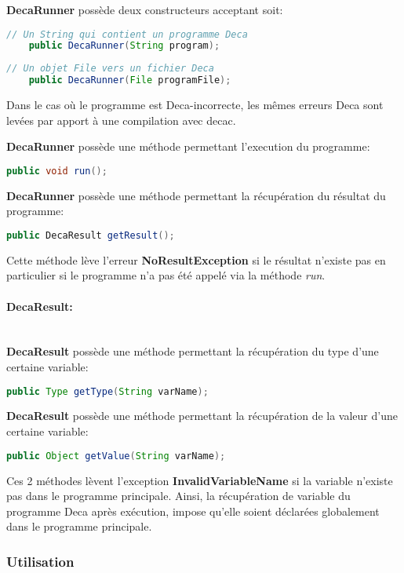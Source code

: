 \documentclass[12pt, a4paper, one side]{article}
\newcommand{\paragraphln}[1]{\paragraph{#1}\mbox{}\\}
\begin{document}
        \textbf{DecaRunner} possède deux constructeurs acceptant soit:
\begin{lstlisting}[language=java]
    // Un String qui contient un programme Deca
    public DecaRunner(String program);
\end{lstlisting}
\begin{lstlisting}[language=java]
    // Un objet File vers un fichier Deca
    public DecaRunner(File programFile);
\end{lstlisting}

        Dans le cas où le programme est Deca-incorrecte, les mêmes erreurs Deca sont levées par apport à une compilation avec decac.

        \textbf{DecaRunner} possède une méthode permettant l'execution du programme:
\begin{lstlisting}[language=java]
    public void run();
\end{lstlisting}

\textbf{DecaRunner} possède une méthode permettant la récupération du résultat du programme:
\begin{lstlisting}[language=java]
    public DecaResult getResult();
\end{lstlisting}
Cette méthode lève l'erreur \textbf{NoResultException} si le résultat n'existe pas en particulier si le programme n'a pas été appelé via la méthode \emph{run}.

        \paragraphln{DecaResult:}

        \textbf{DecaResult} possède une méthode permettant la récupération du type d'une certaine variable:
\begin{lstlisting}[language=java]
    public Type getType(String varName);
\end{lstlisting}

\textbf{DecaResult} possède une méthode permettant la récupération de la valeur d'une certaine variable:
\begin{lstlisting}[language=java]
    public Object getValue(String varName);
\end{lstlisting}
Ces 2 méthodes lèvent l'exception \textbf{InvalidVariableName} si la variable n'existe pas dans le programme principale.
Ainsi, la récupération de variable du programme Deca après exécution, impose qu'elle soient déclarées globalement dans le programme principale.
        \subsubsection{Utilisation}
\end{document}
